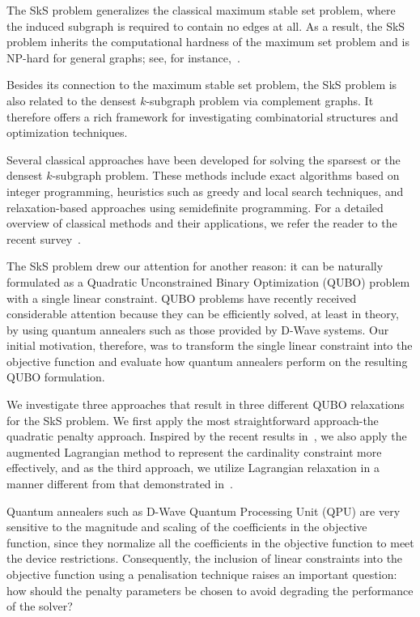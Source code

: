 \documentclass{article}
\begin{document}
The SkS problem generalizes the classical maximum stable set problem, where the induced subgraph is required to contain no edges at all. As a result, the SkS problem inherits the computational hardness of the maximum set problem and is NP-hard for general graphs; see, for instance,~\cite{watrigant}.

Besides its connection to the maximum stable set problem, the SkS problem is also related to the densest $k$-subgraph problem via complement graphs. It therefore offers a rich framework for investigating combinatorial structures and optimization techniques.

Several classical approaches have been developed for solving the sparsest or the densest $k$-subgraph problem. These methods include exact algorithms based on integer programming, heuristics such as greedy and local search techniques, and relaxation-based approaches using semidefinite programming. For a detailed overview of classical methods and their applications, we refer the reader to the recent survey~\cite{Lanciano2024}.

The SkS problem drew our attention for another reason: it can be naturally formulated as a Quadratic Unconstrained Binary Optimization (QUBO) problem with a single linear constraint. QUBO problems have recently received considerable attention because they can be efficiently solved, at least in theory, by using quantum annealers such as those provided by D-Wave systems. Our initial motivation, therefore, was to transform the single linear constraint into the objective function and evaluate how quantum annealers perform on the resulting  QUBO formulation.

 We investigate three approaches that result in three different QUBO  relaxations for the SkS problem. We first apply the most straightforward approach-the quadratic penalty approach. Inspired by the recent results in~\cite{Djidjev2023}, we also apply the augmented Lagrangian method to represent the cardinality constraint more effectively, and as the third approach, we utilize Lagrangian relaxation in a manner different from that demonstrated in~\cite{Ronah}. 

Quantum annealers such as D-Wave Quantum Processing Unit (QPU) are very sensitive to the magnitude and scaling of the coefficients in the objective function, since they normalize all the coefficients in the objective function to meet the device restrictions. Consequently, the inclusion of linear constraints into the objective function using a penalisation technique raises an important question: how should the penalty parameters be chosen to avoid degrading the performance of the solver?
\end{document}
